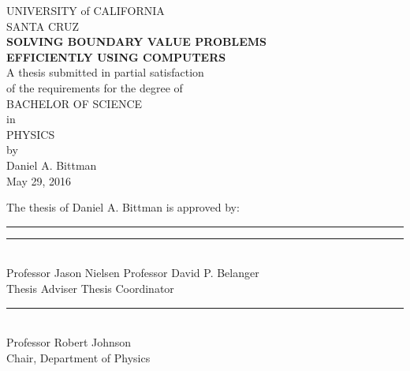 \documentclass[12pt]{article}
\begin{document}

\begin{center}

	UNIVERSITY of CALIFORNIA\\
	\vspace{2mm}
	SANTA CRUZ\\
	\vspace{10mm}
	{\large\textbf{\textsc{SOLVING BOUNDARY VALUE PROBLEMS\\EFFICIENTLY USING COMPUTERS}}}\\
	\vspace{10mm}
	A thesis submitted in partial satisfaction\\of the requirements for the degree of\\
	\vspace{5mm}
	\textsc{BACHELOR OF SCIENCE}\\
	\vspace{3mm}
	in\\
	\vspace{3mm}
	\textsc{PHYSICS}\\
	\vspace{5mm}
	by\\
	\vspace{2mm}
	Daniel A. Bittman\\
	May 29, 2016\\

	\vspace{2in}

	The thesis of Daniel A. Bittman is approved by:\\
	\vspace{1in}

	\rule{2.5in}{2pt}\hfill
	\rule{2.5in}{2pt} \\
	Professor Jason Nielsen \hfill Professor David P. Belanger\\
	Thesis Adviser \hfill Thesis Coordinator\\

	\vspace{15mm}
	\rule{2.5in}{2pt}\\
	Professor Robert Johnson\\
	Chair, Department of Physics

\end{center}

\clearpage
\setcounter{page}{1}
\renewcommand{\thepage}{\roman{page}}
\end{document}
